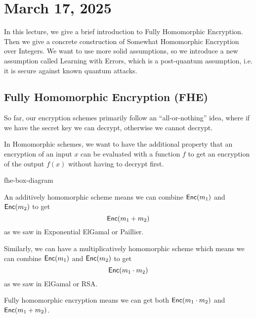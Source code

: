 \section{March 17, 2025}
\label{20250317}

In this lecture, we give a brief introduction to Fully Homomorphic Encryption. Then we give a concrete construction of Somewhat Homomorphic Encryption over Integers. We want to use more solid assumptions, so we introduce a new assumption called Learning with Errors, which is a post-quantum assumption, i.e. it is secure against known quantum attacks.

\subsection{Fully Homomorphic Encryption (FHE)}

So far, our encryption schemes primarily follow an ``all-or-nothing'' idea, where if we have the secret key we can decrypt, otherwise we cannot decrypt.

In Homomorphic schemes, we want to have the additional property that an encryption of an input $x$ can be evaluated with a function $f$ to get an encryption of the output $f(x)$ without having to decrypt first.

\begin{center}
\begin{bbrenv}{fhe-box-diagram}
\begin{bbrbox}[name=Eval, namepos=center]
\end{bbrbox}
\end{bbrenv}
\end{center}

An additively homomorphic scheme means we can combine $\operatorname{\mathsf{Enc}}(m_1)$ and $\operatorname{\mathsf{Enc}}(m_2)$ to get
\[\operatorname{\mathsf{Enc}}(m_1 + m_2)\]
as we saw in Exponential ElGamal or Paillier.

Similarly, we can have a multiplicatively homomorphic scheme which means we can combine $\operatorname{\mathsf{Enc}}(m_1)$ and $\operatorname{\mathsf{Enc}}(m_2)$ to get
\[\operatorname{\mathsf{Enc}}(m_1 \cdot m_2)\]
as we saw in ElGamal or RSA.

Fully homomorphic encryption means we can get both $\operatorname{\mathsf{Enc}}(m_1 \cdot m_2)$ and $\operatorname{\mathsf{Enc}}(m_1 + m_2)$.

